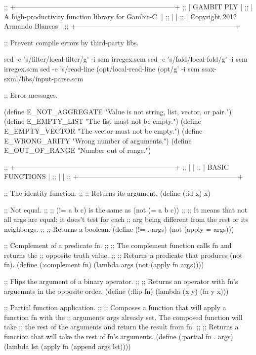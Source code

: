 ;; +---------------------------------------------------------------------+
;; |  GAMBIT PLY                                                         |
;; |  A high-productivity function library for Gambit-C.                 |
;; |                                                                     |
;; |  Copyright 2012 Armando Blancas                                     |
;; +---------------------------------------------------------------------+

;; Prevent compile errors by third-party libs.

  sed -e 's/filter/local-filter/g' -i scm irregex.scm
  sed -e 's/fold/local-fold/g' -i scm irregex.scm
  sed -e 's/read-line (opt/local-read-line (opt/g' -i scm ssax-sxml/libs/input-parse.scm

;; Error messages.

(define E_NOT_AGGREGATE "Value is not string, list, vector, or pair.")
(define E_EMPTY_LIST    "The list must not be empty.")
(define E_EMPTY_VECTOR  "The vector must not be empty.")
(define E_WRONG_ARITY   "Wrong number of arguments.")
(define E_OUT_OF_RANGE  "Number out of range.")


;; +---------------------------------------------------------------------+
;; |                                                                     |
;; |                          BASIC FUNCTIONS                            |
;; |                                                                     |
;; +---------------------------------------------------------------------+

 
;; The identity function.
;;
;; Returns its argument.
(define (:id x) x)


;; Not equal.
;;
;; (!= a b c) is the same as (not (= a b c))
;;
;; It means that not all args are equal; it does't test for each
;; arg being different from the rest or its neighborgs.
;;
;; Returns a boolean.
(define (!= . args)
  (not (apply = args)))


;; Complement of a predicate fn.
;;
;; The complement function calls fn and returns the
;; opposite truth value.
;;
;; Returns a predicate that produces (not fn).
(define (:complement fn)
  (lambda args
    (not (apply fn args))))


;; Flips the argument of a binary operator.
;;
;; Returns an operator with fn's arguemnts in the opposite order.
(define (:flip fn)
  (lambda (x y) (fn y x)))


;; Partial function application.
;;
;; Composes a function that will apply a function fn with the
;; arguments args already set. The composed function will take
;; the rest of the arguments and return the result from fn.
;;
;; Returns a function that will take the rest of fn's arguments.
(define (:partial fn . args) 
  (lambda lst (apply fn (append args lst))))


